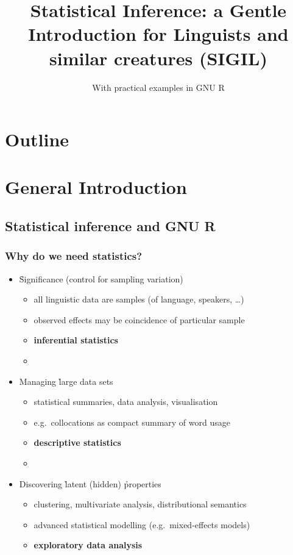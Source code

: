 \documentclass[t]{beamer} %
\title[1.\ Introduction]{Statistical Inference: a Gentle Introduction
  for Linguists and similar creatures (SIGIL)}
\subtitle{With practical examples in GNU R}
\begin{document}
\frame{\titlepage}


\section*{Outline}

\section{General Introduction}

\subsection{Statistical inference and GNU R}

\begin{frame}
  \frametitle{Why do we need statistics?}

  \begin{itemize}
  \item<2-> \h{Significance} (control for sampling variation)
    \begin{itemize}
    \item all linguistic data are samples (of language, speakers, \ldots)
    \item observed effects may be coincidence of particular sample
    \item[\So] \textbf{inferential statistics}
    \item[]
    \end{itemize}
  \item<3-> Managing \h{large data sets}
    \begin{itemize}
    \item statistical summaries, data analysis, visualisation
    \item e.g.\ collocations as compact summary of word usage
    \item[\So] \textbf{descriptive statistics}
    \item[]
    \end{itemize}
  \item<4-> Discovering \h{latent} (hidden) \h{properties}
    \begin{itemize}
    \item clustering, multivariate analysis, distributional semantics
    \item advanced statistical modelling (e.g.\ mixed-effects models)
    \item[\So] \textbf{exploratory data analysis}
    \end{itemize}
  \end{itemize}
\end{frame}
\end{document}
